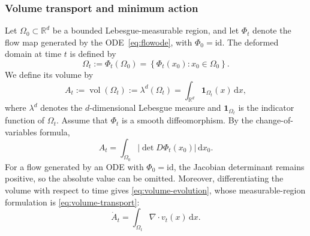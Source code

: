 \documentclass[12pt,a4paper,oneside]{book}
\begin{document}
\subsubsection{Volume transport and minimum action}

Let $\Omega_0\subset\mathbb R^d$ be a bounded Lebesgue-measurable region, and let $\Phi_t$ denote the flow map generated
by the ODE~\eqref{eq:flowode}, with $\Phi_0=\mathrm{id}$. The deformed domain at time $t$ is defined by
\begin{equation*}
    \Omega_t:=\Phi_t(\Omega_0) = \left\{\Phi_t(x_0):x_0\in\Omega_0\right\}.
\end{equation*}
We define its volume by
\begin{equation*}
    A_t:=\operatorname{vol}(\Omega_t) := \lambda^d(\Omega_t)
        = \int_{\mathbb R^d}\mathbf 1_{\Omega_t}(x)\,\mathrm dx,
\end{equation*}
where $\lambda^d$ denotes the $d$-dimensional Lebesgue measure and $\mathbf 1_{\Omega_t}$ is the indicator function of
$\Omega_t$. Assume that $\Phi_t$ is a smooth diffeomorphism. By the change-of-variables formula,
\begin{equation*}
    A_t = \int_{\Omega_0} \left|\det D\Phi_t(x_0)\right|\,\mathrm dx_0.
\end{equation*}
For a flow generated by an ODE with $\Phi_0=\mathrm{id}$, the Jacobian determinant remains positive, so the absolute value
can be omitted. Moreover, differentiating the volume with respect to time gives \eqref{eq:volume-evolution},
whose measurable-region formulation is \eqref{eq:volume-transport}:
\begin{equation}
    \dot A_t = \int_{\Omega_t}\nabla\cdot v_t(x)\,\mathrm dx.
    \label{eq:volume-evolution}
\end{equation}
\end{document}
